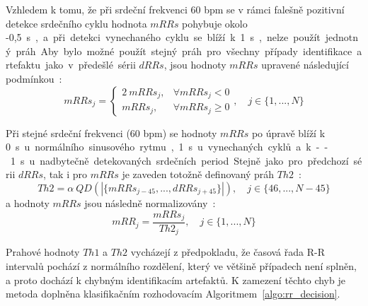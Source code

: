 Vzhledem k tomu, že při srdeční frekvenci 60 bpm se v rámci falešně pozitivní detekce 
srdečního cyklu hodnota $mRRs$ pohybuje okolo -0,5~\si\s, a při detekci
vynechaného cyklu se blíží k 1~\si\s, nelze použít jednotný práh. Aby bylo
možné použít stejný práh pro všechny případy identifikace artefaktu jako v
předešlé sérii $dRRs$, jsou hodnoty $mRRs$ upravené následující
podmínkou~\cite{Lipponen2019}:
\begin{equation}
    mRRs_j =
    \begin{cases}
        2~mRRs_j, & \forall mRRs_j < 0    \\
        mRRs_j,   & \forall mRRs_j \geq 0
    \end{cases}
    , \quad j \in \{1,...,N\}
\end{equation}

Při stejné srdeční frekvenci (60 bpm) se hodnoty $mRRs$ po úpravě blíží k
0~\si\s~u normálního sinusového rytmu, 1~\si\s~ u vynechaných cyklů a k
--1~\si\s~ u nadbytečně detekovaných srdečních period. Stejně jako pro předchozí
sérii $dRRs$, tak i pro $mRRs$ je zaveden totožně definovaný práh
$Th2$~\cite{Lipponen2019}:
\begin{equation}
    Th2 = \alpha~QD(|\{mRRs_{j-45},...,dRRs_{j+45}\}|), \quad j \in \{46,...,N-45\}
\end{equation}
a hodnoty $mRRs$ jsou následně normalizovány~\cite{Lipponen2019}:
\begin{equation}
    mRR_j = \frac{mRRs_j}{Th2_j}, \quad j \in \{1,...,N\}
\end{equation}

Prahové hodnoty $Th1$ a $Th2$ vycházejí z předpokladu, že časová řada R-R
intervalů pochází z normálního rozdělení, který ve většině případech není
splněn, a proto dochází k chybným identifikacím artefaktů. K zamezení těchto
chyb je metoda doplněna klasifikačním rozhodovacím Algoritmem~\ref{algo:rr_decision}.

